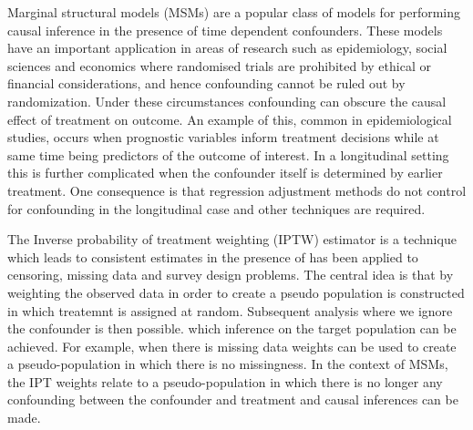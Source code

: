 \documentclass[11pt]{article}
\begin{document}
Marginal structural models (MSMs) are a popular class of models for
performing causal inference in the presence of time dependent
confounders. These models have an important application in areas of
research such as epidemiology, social sciences and economics where
randomised trials are prohibited by ethical or financial considerations,
and hence confounding cannot be ruled out by randomization. Under these
circumstances confounding can obscure the causal effect of treatment on
outcome. An example of this, common in epidemiological studies, occurs
when prognostic variables inform treatment decisions while at same time
being predictors of the outcome of interest. In a longitudinal setting
this is further complicated when the confounder itself is determined by
earlier treatment. One consequence is that regression adjustment methods
do not control for confounding in the longitudinal case and other
techniques are required. \linebreak

The Inverse probability of treatment weighting (IPTW) estimator is a
technique which leads to consistent estimates in the presence of has
been applied to censoring, missing data and survey design problems. The
central idea is that by weighting the observed data in order to create a
pseudo population is constructed in which treatemnt is assigned at
random. Subsequent analysis where we ignore the confounder is then
possible. which inference on the target population can be achieved. For
example, when there is missing data weights can be used to create a
pseudo-population in which there is no missingness. In the context of
MSMs, the IPT weights relate to a pseudo-population in which there is no
longer any confounding between the confounder and treatment and causal
inferences can be made. \linebreak
\end{document}
